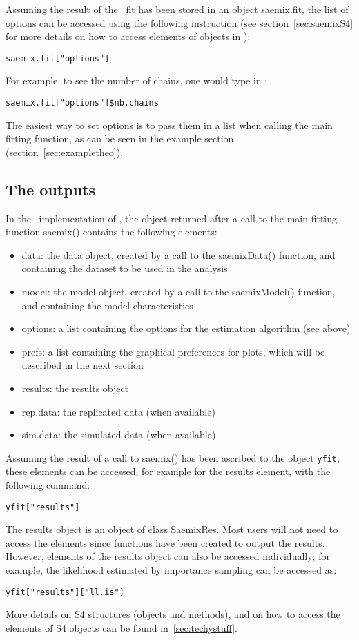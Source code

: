 Assuming the result of the \monolix~fit has been stored in an object {\sf saemix.fit}, the list of options can be accessed using the following instruction (see section~\ref{sec:saemixS4} for more details on how to access elements of objects in \R):
\begin{verbatim}
saemix.fit["options"]
\end{verbatim}
For example, to see the number of chains, one would type in \R:
\begin{verbatim}
saemix.fit["options"]$nb.chains
\end{verbatim}

The easiest way to set options is to pass them in a list when calling the main fitting function, as can be seen in the example section (section~\ref{sec:exampletheo}).

\clearpage
\subsection{The outputs}

In the \R~implementation of \monolix, the object returned after a call to the main fitting function {\sf saemix()} contains the following elements:
\begin{itemize}
\item data: the data object, created by a call to the {\sf saemixData()} function, and containing the dataset to be used in the analysis
\item model: the model object, created by a call to the {\sf saemixModel()} function, and containing the model characteristics
\item options: a list containing the options for the estimation algorithm (see above)
\item prefs: a list containing the graphical preferences for plots, which will be described in the next section
\item results: the results object
\item rep.data: the replicated data (when available)
\item sim.data: the simulated data (when available)
\end{itemize}
Assuming the result of a call to {\sf saemix()} has been ascribed to the object \verb+yfit+, these elements can be accessed, for example for the results element, with the following command:
\begin{verbatim}
yfit["results"]
\end{verbatim}
The results object is an object of class {\sf SaemixRes}. Most users will not need to access the elements since functions have been created to output the results. However, elements of the results object can also be accessed individually; for example, the likelihood estimated by importance sampling can be accessed as:
\begin{verbatim}
yfit["results"]["ll.is"]
\end{verbatim}
More details on S4 structures (objects and methods), and on how to access the elements of S4 objects can be found in~\ref{sec:techystuff}.

